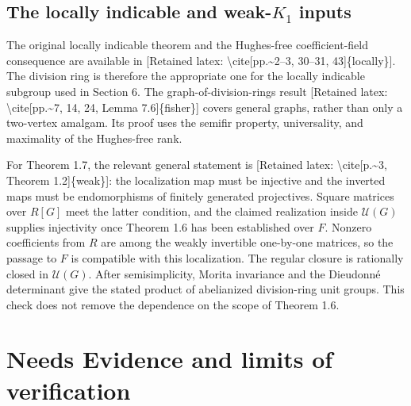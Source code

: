 \documentclass[10pt]{article}
\begin{document}
\subsection*{The locally indicable and weak-\(K_1\) inputs}
The original locally indicable theorem and the Hughes-free coefficient-field consequence are available in [Retained latex: \textbackslash{}cite[pp.\textasciitilde{}2--3, 30--31, 43]\{locally\}]. The division ring is therefore the appropriate one for the locally indicable subgroup used in Section 6. The graph-of-division-rings result [Retained latex: \textbackslash{}cite[pp.\textasciitilde{}7, 14, 24, Lemma 7.6]\{fisher\}] covers general graphs, rather than only a two-vertex amalgam. Its proof uses the semifir property, universality, and maximality of the Hughes-free rank.\par
For Theorem 1.7, the relevant general statement is [Retained latex: \textbackslash{}cite[p.\textasciitilde{}3, Theorem 1.2]\{weak\}]: the localization map must be injective and the inverted maps must be endomorphisms of finitely generated projectives. Square matrices over \(R[G]\) meet the latter condition, and the claimed realization inside \(\mathcal U(G)\) supplies injectivity once Theorem 1.6 has been established over \(F\). Nonzero coefficients from \(R\) are among the weakly invertible one-by-one matrices, so the passage to \(F\) is compatible with this localization. The regular closure is rationally closed in \(\mathcal U(G)\). After semisimplicity, Morita invariance and the Dieudonné determinant give the stated product of abelianized division-ring unit groups. This check does not remove the dependence on the scope of Theorem 1.6.\par
\section*{Needs Evidence and limits of verification}
\end{document}

